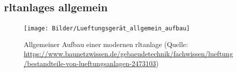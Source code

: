 \subsection{\Acp{rltanlage} allgemein}

\begin{figure}[H]
	\centering
	\texttt{[image: Bilder/Lueftungsgerät\_allgemein\_aufbau]}
	\caption[Allgemeiner Aufbau einer modernen \ac{rltanlage} (Quelle: \url{https://www.baunetzwissen.de/gebaeudetechnik/fachwissen/lueftung/bestandteile-von-lueftungsanlagen-2473103}, Zugriff am 13.02.2024)]{Allgemeiner Aufbau einer modernen \ac{rltanlage} (Quelle: \url{https://www.baunetzwissen.de/gebaeudetechnik/fachwissen/lueftung/bestandteile-von-lueftungsanlagen-2473103})}
	\label{fig:Aufbau_Lueftungsgerät_allgemein}
\end{figure}

